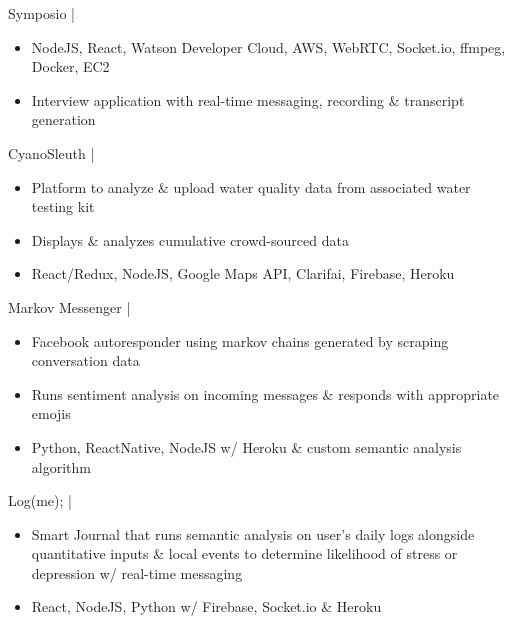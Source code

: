 \documentclass[]{friggeri-cv}
\begin{document}
\begin{entrylist}
	\entry
	{Symposio | \href{https://github.com/suzyng83209/symposio}{\faGithub} \ \href{http://symposiostream}{\faLink}}
	{\vspace{0.5\parsep}}
	{
		\begin{itemize}[leftmargin=*]
			\vspace{-0.4cm}
			\item NodeJS, React, Watson Developer Cloud, AWS, WebRTC, Socket.io, ffmpeg, Docker, EC2 
			\item Interview application with real-time messaging, recording \& transcript generation
		\end{itemize}
	}
	\entry
	{CyanoSleuth | \href{https://github.com/suzyng83209/cyanosleuth}{\faGithub}}
	{\vspace{0.5\parsep}}
	{
		\begin{itemize}[leftmargin=*]
			\vspace{-0.4cm}
			\item Platform to analyze \& upload water quality data from associated water testing kit
			\item Displays \& analyzes cumulative crowd-sourced data
			\item React/Redux, NodeJS, Google Maps API, Clarifai, Firebase, Heroku
		\end{itemize}
	}
	\entry
	{Markov Messenger | \href{https://github.com/suzyng83209/markov-messenger-bot}{\faGithub}}
	{\vspace{0.5\parsep}}
	{
		\begin{itemize}[leftmargin=*]
			\vspace{-0.4cm}
			\item Facebook autoresponder using markov chains generated by scraping conversation data
			\item Runs sentiment analysis on incoming messages \& responds with appropriate emojis
			\item Python, ReactNative, NodeJS w/ Heroku \& custom semantic analysis algorithm
		\end{itemize}
	}
	\entry
	{Log(me); | \href{https://github.com/suzyng83209/htn2017}{\faGithub}}
	{\vspace{0.5\parsep}}
	{
		\begin{itemize}[leftmargin=*]
			\vspace{-0.4cm}
			\item Smart Journal that runs semantic analysis on user's daily logs alongside quantitative inputs \& local events to determine likelihood of stress or depression w/ real-time messaging
			\item React, NodeJS, Python w/ Firebase, Socket.io \& Heroku
		\end{itemize}
	}
\end{entrylist}
\end{document}
